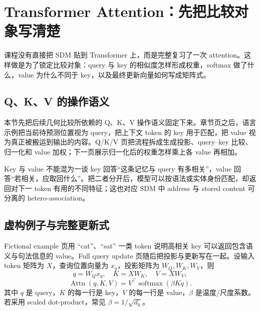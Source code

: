 \section{Transformer Attention：先把比较对象写清楚}

课程没有直接把 SDM 贴到 Transformer 上，而是完整复习了一次 attention。这样做是为了锁定比较对象：query 与 key 的相似度怎样形成权重，softmax 做了什么，value 为什么不同于 key，以及最终更新向量如何写成矩阵式。

\subsection{Q、K、V 的操作语义}

本节先把后续几何比较所依赖的 Q、K、V 操作语义固定下来。章节页之后，语言示例把当前待预测位置视为 query，把上下文 token 的 key 用于匹配，把 value 视为真正被搬运到输出的内容。Q/K/V 页把流程拆成生成投影、query--key 比较、归一化和 value 加权；下一页展示归一化后的权重怎样乘上各 value 再相加。





\begin{importantbox}{Key 与 value 不能混为一谈}
key 回答“这条记忆与 query 有多相关”，value 回答“若相关，应取回什么”。把二者分开后，模型可以按语法或实体身份匹配，却返回对下一 token 有用的不同特征；这也对应 SDM 中 address 与 stored content 可分离的 hetero-association。
\end{importantbox}

\subsection{虚构例子与完整更新式}

Fictional example 页用 ``cat''、``sat'' 一类 token 说明高相关 key 可以返回包含语义与句法信息的 value。Full query update 页随后把投影与更新写在一起。设输入 token 矩阵为 $X$，查询位置向量为 $x_q$，投影矩阵为 $W_Q,W_K,W_V$，则
$$
q=W_Qx_q,\quad K=XW_K,\quad V=XW_V,
$$
$$
\operatorname{Attn}(q,K,V)
=V^{\top}\operatorname{softmax}\!\left(\beta Kq\right).
$$
其中 $q$ 是 query，$K$ 的每一行是 key，$V$ 的每一行是 value，$\beta$ 是温度/尺度系数。若采用 scaled dot-product，常见 $\beta=1/\sqrt{d_k}$。

